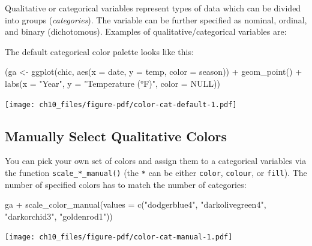 \documentclass[
  letterpaper,
  DIV=11,
  numbers=noendperiod]{scrreprt}
\newenvironment{Shaded}{\begin{snugshade}}{\end{snugshade}}
\newcommand{\AttributeTok}[1]{\textcolor[rgb]{0.40,0.45,0.13}{#1}}
\newcommand{\ConstantTok}[1]{\textcolor[rgb]{0.56,0.35,0.01}{#1}}
\newcommand{\FunctionTok}[1]{\textcolor[rgb]{0.28,0.35,0.67}{#1}}
\newcommand{\NormalTok}[1]{\textcolor[rgb]{0.00,0.23,0.31}{#1}}
\newcommand{\OtherTok}[1]{\textcolor[rgb]{0.00,0.23,0.31}{#1}}
\newcommand{\SpecialCharTok}[1]{\textcolor[rgb]{0.37,0.37,0.37}{#1}}
\newcommand{\StringTok}[1]{\textcolor[rgb]{0.13,0.47,0.30}{#1}}
\begin{document}
Qualitative or categorical variables represent types of data which can
be divided into groups (\emph{categories}). The variable can be further
specified as nominal, ordinal, and binary (dichotomous). Examples of
qualitative/categorical variables are:

The default categorical color palette looks like this:

\begin{Shaded}
\begin{Highlighting}[]
\NormalTok{(ga }\OtherTok{\textless{}{-}} \FunctionTok{ggplot}\NormalTok{(chic, }\FunctionTok{aes}\NormalTok{(}\AttributeTok{x =}\NormalTok{ date, }\AttributeTok{y =}\NormalTok{ temp, }\AttributeTok{color =}\NormalTok{ season)) }\SpecialCharTok{+}
  \FunctionTok{geom\_point}\NormalTok{() }\SpecialCharTok{+}
  \FunctionTok{labs}\NormalTok{(}\AttributeTok{x =} \StringTok{"Year"}\NormalTok{, }\AttributeTok{y =} \StringTok{"Temperature (°F)"}\NormalTok{, }\AttributeTok{color =} \ConstantTok{NULL}\NormalTok{))}
\end{Highlighting}
\end{Shaded}

\texttt{[image: ch10\_files/figure-pdf/color-cat-default-1.pdf]}

\subsection{Manually Select Qualitative
Colors}\label{manually-select-qualitative-colors}

You can pick your own set of colors and assign them to a categorical
variables via the function \texttt{scale\_*\_manual()} (the \texttt{*}
can be either \texttt{color}, \texttt{colour}, or \texttt{fill}). The
number of specified colors has to match the number of categories:

\begin{Shaded}
\begin{Highlighting}[]
\NormalTok{ga }\SpecialCharTok{+} \FunctionTok{scale\_color\_manual}\NormalTok{(}\AttributeTok{values =} \FunctionTok{c}\NormalTok{(}\StringTok{"dodgerblue4"}\NormalTok{,}
                                   \StringTok{"darkolivegreen4"}\NormalTok{,}
                                   \StringTok{"darkorchid3"}\NormalTok{,}
                                   \StringTok{"goldenrod1"}\NormalTok{))}
\end{Highlighting}
\end{Shaded}

\texttt{[image: ch10\_files/figure-pdf/color-cat-manual-1.pdf]}
\end{document}

